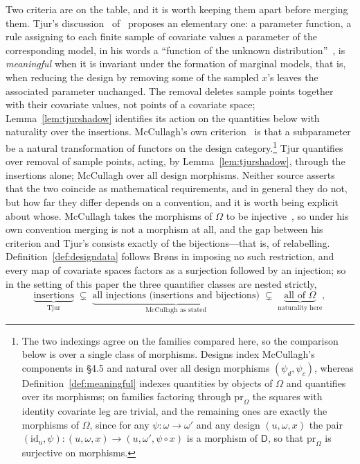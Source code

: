 \documentclass[11pt,a4paper]{article}
\theoremstyle{plain}
\theoremstyle{definition}
\theoremstyle{remark}
\newcommand{\cat}[1]{\mathsf{#1}}
\newcommand{\catO}{\cat{\Omega}}
\newcommand{\catD}{\cat{D}}
\newcommand{\id}{\mathrm{id}}
\newcommand{\pr}{\mathrm{pr}}
\begin{document}
Two criteria are on the table, and it is worth keeping them apart before
merging them. Tjur's discussion~\cite{tjur_discussion_2002}
of~\cite{mccullagh_what_2002} proposes an elementary one: a
parameter function, a rule assigning to each finite sample of covariate
values a parameter of the corresponding model, in his words a ``function of
the unknown distribution''~\cite[p.~1299]{tjur_discussion_2002}, is
\emph{meaningful} when it is invariant under the formation of marginal
models, that is, when reducing the design by removing some of the sampled
$x$'s leaves the associated parameter unchanged. The removal deletes sample
points together with their covariate values, not points of a covariate
space; Lemma~\ref{lem:tjurshadow} identifies its action on the quantities
below with naturality over the insertions. McCullagh's own
criterion~\cite[\S4.5]{mccullagh_what_2002} is that a subparameter be a natural
transformation of functors on the design category.\footnote{\label{fn:indexings}The two indexings
agree on the families compared here, so the comparison below is over a single
class of morphisms. Designs index McCullagh's components in \S4.5 and
natural over all design morphisms $(\psi_{d},\psi_{c})$, whereas
Definition~\ref{def:meaningful} indexes quantities by objects of $\catO$ and
quantifies over its morphisms; on families factoring through $\pr_{\catO}$ the
squares with identity covariate leg are trivial, and the remaining ones are
exactly the morphisms of $\catO$, since for
any $\psi \colon \omega \to \omega'$ and any design $(u,\omega,x)$ the pair
$(\id_{u},\psi) \colon (u,\omega,x) \to (u,\omega',\psi\circ x)$ is a morphism
of $\catD$, so that $\pr_{\catO}$ is surjective on morphisms.} Tjur quantifies over
removal of sample points, acting, by Lemma~\ref{lem:tjurshadow}, through
the insertions alone; McCullagh over all design morphisms. Neither source
asserts that the two coincide as mathematical requirements, and in general they
do not, but how far they
differ depends on a convention, and it is worth being explicit about whose.
McCullagh takes the morphisms of $\catO$ to be
injective~\cite[\S4.1]{mccullagh_what_2002}, so under his own convention
merging is not a morphism at all, and the gap between his criterion and Tjur's
consists exactly of the bijections—that is, of relabelling.
Definition~\ref{def:designdata} follows Br\o ns in imposing no such
restriction, and every map of covariate spaces factors as a surjection
followed by an injection; so in the setting of this paper the three quantifier
classes are nested strictly,
\[
\underbrace{\text{insertions}}_{\text{Tjur}}
\;\subsetneq\;
\underbrace{\text{all injections (insertions and bijections)}}_{\text{McCullagh as stated}}
\;\subsetneq\;
\underbrace{\text{all of } \catO}_{\text{naturality here}},
\]
\end{document}
